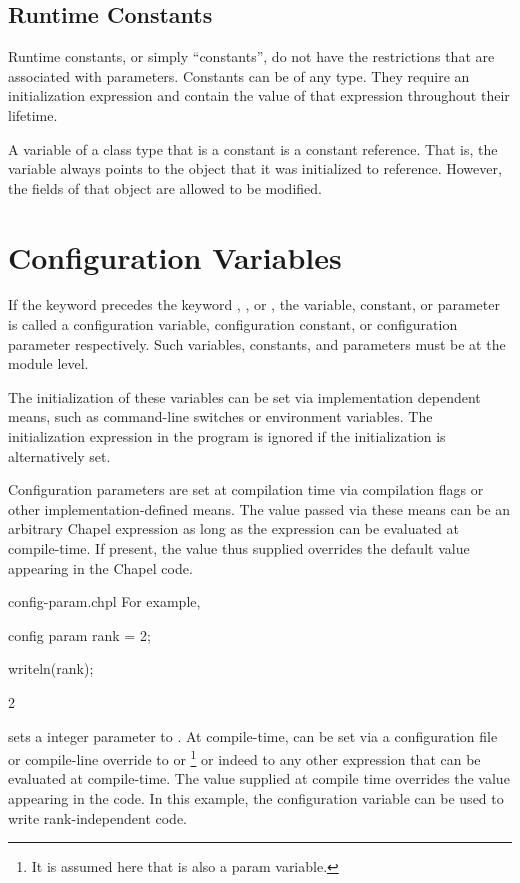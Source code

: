 \subsection{Runtime Constants}
\label{Runtime_Constants}

Runtime constants, or simply ``constants'',
do not have the restrictions that are associated with
parameters.  Constants can be of any type.  They require an initialization
expression and contain the value of that expression throughout their lifetime.

A variable of a class type that is a constant is a constant reference.
That is, the variable always
points to the object that it was initialized to reference.
However, the fields of that object are allowed to be modified.

\section{Configuration Variables}
\label{Configuration_Variables}

If the keyword  precedes the
keyword , , or , the variable,
constant, or parameter is called a configuration variable,
configuration constant, or configuration parameter respectively.  Such
variables, constants, and parameters must be at the module level.

The initialization of these variables can be set via implementation
dependent means, such as command-line switches or environment
variables.  The initialization expression in the program is ignored if
the initialization is alternatively set.

Configuration parameters are set at compilation time via compilation
flags or other implementation-defined means.  The value passed via
these means can be an arbitrary Chapel expression as long as the
expression can be evaluated at compile-time.  If present, the value thus
supplied overrides the default value appearing in the Chapel code.

\begin{chapelexample}{config-param.chpl}
For example,
\begin{chapel}
config param rank = 2;
\end{chapel}
\begin{chapelnoprint}
writeln(rank);
\end{chapelnoprint}
\begin{chapeloutput}
2
\end{chapeloutput}
sets a integer parameter  to .  At
compile-time,  can be set via a configuration file or compile-line
override to  or \footnote{It is assumed here that  is
also a param variable.} or indeed to any other expression
that can be evaluated at compile-time.  The value supplied at compile time
overrides the value  appearing in the code.  In this example, the 
configuration variable can be used to write rank-independent code.
\end{chapelexample}
